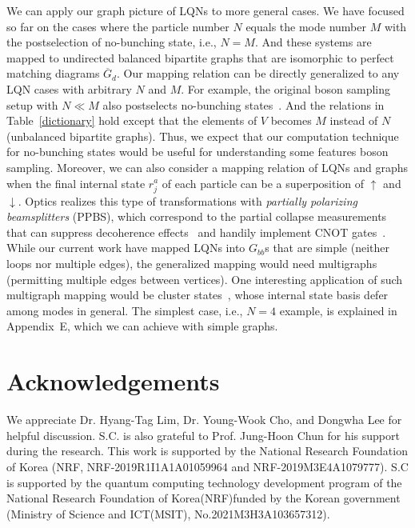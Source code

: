 \documentclass[a4paper,twocolumn,8pt,accepted=2021-12-15]{quantumarticle}
\def\dc{{\overline{G}_d }}
\begin{document}
	We can apply our graph picture of LQNs to more general cases. We have focused so far on the cases where the particle number $N$ equals the mode number $M$ with the postselection of no-bunching state, i.e., $N=M$. And these systems are mapped to undirected balanced bipartite graphs that are isomorphic to perfect matching diagrams $\dc$. Our mapping relation can be directly generalized to any LQN cases with arbitrary $N$ and $M$. For example, the original boson sampling setup  with $N\ll M$ also postselects no-bunching states~\cite{aaronson2011computational}. And the relations in Table~\ref{dictionary} hold except that the elements of $V$ becomes $M$ instead of $N$ (unbalanced bipartite graphs). Thus, we expect that our computation technique for no-bunching states would be useful for understanding some features boson sampling. Moreover,
	we can also consider a mapping relation of LQNs and graphs when the final internal state $r_j^a$ of each particle can be a superposition of $\uparrow$ and $\downarrow$.
	Optics realizes this type of transformations with \emph{partially polarizing beamsplitters} (PPBS), which correspond to the partial collapse measurements that can suppress decoherence effects~\cite{kim2012protecting} and handily implement CNOT gates~\cite{langford2005demonstration,kiesel2005linear,okamoto2005demonstration}. While our current work have mapped LQNs into $G_{bb}$s that are simple (neither loops nor multiple edges), the generalized mapping would need multigraphs (permitting  multiple edges between vertices). One interesting application of such multigraph mapping would be cluster states~\cite{briegel2001persistent}, whose internal state basis defer among modes in general. The simplest case, i.e., $N=4$ example, is explained in Appendix~E, which we can achieve with simple graphs.
	
	
	
	\section*{Acknowledgements}
	We appreciate Dr. Hyang-Tag Lim, Dr. Young-Wook Cho, and Dongwha Lee for  helpful discussion. S.C. is also grateful to Prof. Jung-Hoon Chun for his support during the research. This work is supported by the National Research Foundation of Korea (NRF, NRF-2019R1I1A1A01059964 and NRF-2019M3E4A1079777). S.C is supported by the quantum computing technology development program of the National Research Foundation of Korea(NRF)funded by the Korean government (Ministry of Science and ICT(MSIT), No.2021M3H3A103657312).
	
\end{document}
